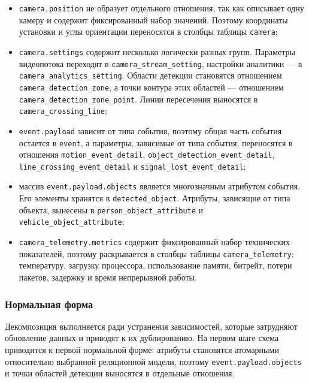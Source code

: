 \begin{itemize}
  \item \texttt{camera.position} не образует отдельного отношения, так как
        описывает одну камеру и содержит фиксированный набор значений. Поэтому
        координаты установки и углы ориентации переносятся в столбцы таблицы
        \texttt{camera};

  \item \texttt{camera.settings} содержит несколько логически разных групп.
        Параметры видеопотока переходят в
        \texttt{camera\_stream\_setting}, настройки аналитики --- в
        \texttt{camera\_analytics\_setting}. Области детекции становятся
        отношением \texttt{camera\_detection\_zone}, а точки контура этих
        областей --- отношением \texttt{camera\_detection\_zone\_point}.
        Линии пересечения выносятся в \texttt{camera\_crossing\_line};

  \item \texttt{event.payload} зависит от типа события, поэтому общая часть
        события остается в \texttt{event}, а параметры, зависимые от типа события,
        переносятся в отношения \texttt{motion\_event\_detail},
        \texttt{object\_detection\_event\_detail},
        \texttt{line\_crossing\_event\_detail} и
        \texttt{signal\_lost\_event\_detail};

  \item массив \texttt{event.payload.objects} является многозначным
        атрибутом события. Его элементы хранятся в
        \texttt{detected\_object}. Атрибуты, зависящие от типа объекта,
        вынесены в \texttt{person\_object\_attribute} и
        \texttt{vehicle\_object\_attribute};

  \item \texttt{camera\_telemetry.metrics} содержит фиксированный набор
        технических показателей, поэтому раскрывается в столбцы таблицы
        \texttt{camera\_telemetry}: температуру, загрузку процессора,
        использование памяти, битрейт, потери пакетов, задержку и время
        непрерывной работы.
\end{itemize}

\subsubsection{Нормальная форма}

Декомпозиция выполняется ради устранения зависимостей, которые затрудняют
обновление данных и приводят к их дублированию. На первом шаге схема
приводится к первой нормальной форме: атрибуты становятся атомарными
относительно выбранной реляционной модели, поэтому
\texttt{event.payload.objects} и точки областей детекции выносятся в
отдельные отношения.


